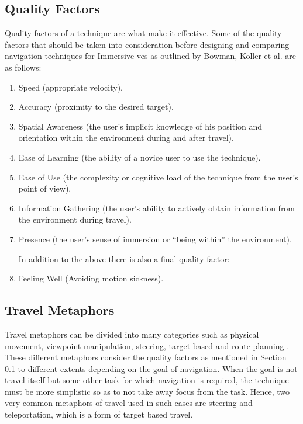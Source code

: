 \subsection{Quality Factors}
\label{subsection RW Navigation:Quality Factors}
Quality factors of a technique are what make it effective. Some of the quality factors that should be taken into consideration before designing and comparing navigation techniques for Immersive \acrshort{ve}s as outlined by Bowman, Koller et al. are as follows:
\begin{enumerate}
	\item Speed (appropriate velocity).
	\item Accuracy (proximity to the desired target).
	\item Spatial Awareness (the user’s implicit knowledge of his	position and orientation within the environment during
	and after travel).
	\item Ease of Learning (the ability of a novice user to use the	technique).
	\item Ease of Use (the complexity or cognitive load of the
	technique from the user’s point of view).
	\item Information Gathering (the user’s ability to actively
	obtain information from the environment during travel).
	\item Presence (the user’s sense of immersion or “being
	within” the environment)\cite{Bowman1997}.
	
	In addition to the above there is also a final quality factor:
	\item Feeling Well (Avoiding motion sickness).
\end{enumerate}

\subsection{Travel Metaphors}
\label{subsection RW Navigation: Travel Metaphors}
Travel metaphors can be divided into many categories such as physical movement, viewpoint manipulation, steering, target based and route planning \cite{Bowman2001}. These different metaphors consider the quality factors as mentioned in Section \ref{subsection RW Navigation:Quality Factors} to different extents depending on the goal of navigation. When the goal is not travel itself but some other task for which navigation is required, the technique must be more simplistic so as to not take away focus from the task. Hence, two very common metaphors of travel used in such cases are steering and teleportation, which is a form of target based travel.

